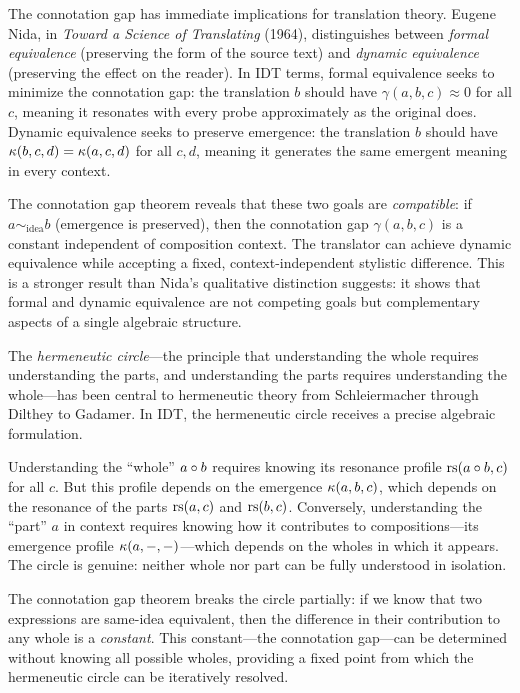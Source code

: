 \begin{remark}\label{rem:ch6:connotation_translation}
The connotation gap has immediate implications for translation theory.
Eugene Nida, in \emph{Toward a Science of Translating} (1964),
distinguishes between \emph{formal equivalence} (preserving the form of
the source text) and \emph{dynamic equivalence} (preserving the effect
on the reader). In IDT terms, formal equivalence seeks to minimize the
connotation gap: the translation $b$ should have $\gamma(a, b, c) \approx
0$ for all $c$, meaning it resonates with every probe approximately as
the original does. Dynamic equivalence seeks to preserve emergence:
the translation $b$ should have $\kappa(b, c, d) = \kappa(a, c, d)$
for all $c, d$, meaning it generates the same emergent meaning in every
context.

The connotation gap theorem reveals that these two goals are
\emph{compatible}: if $a \sim_{\text{idea}} b$ (emergence is preserved),
then the connotation gap $\gamma(a, b, c)$ is a constant independent
of composition context. The translator can achieve dynamic equivalence
while accepting a fixed, context-independent stylistic difference.
This is a stronger result than Nida's qualitative distinction suggests:
it shows that formal and dynamic equivalence are not competing goals
but complementary aspects of a single algebraic structure.
\end{remark}

\begin{remark}\label{rem:ch6:hermeneutic_circle}
The \emph{hermeneutic circle}---the principle that understanding the
whole requires understanding the parts, and understanding the parts
requires understanding the whole---has been central to hermeneutic theory
from Schleiermacher through Dilthey to Gadamer. In IDT, the hermeneutic
circle receives a precise algebraic formulation.

Understanding the ``whole'' $a \circ b$ requires knowing its resonance
profile $\mathrm{rs}(a \circ b, c)$ for all $c$. But this profile depends on
the emergence $\kappa(a, b, c)$, which depends on the resonance of the
parts $\mathrm{rs}(a, c)$ and $\mathrm{rs}(b, c)$. Conversely, understanding the
``part'' $a$ in context requires knowing how it contributes to
compositions---its emergence profile $\kappa(a, -, -)$---which depends
on the wholes in which it appears. The circle is genuine: neither whole
nor part can be fully understood in isolation.

The connotation gap theorem breaks the circle partially: if we know
that two expressions are same-idea equivalent, then the difference in
their contribution to any whole is a \emph{constant}. This constant---the
connotation gap---can be determined without knowing all possible wholes,
providing a fixed point from which the hermeneutic circle can be
iteratively resolved.
\end{remark}

